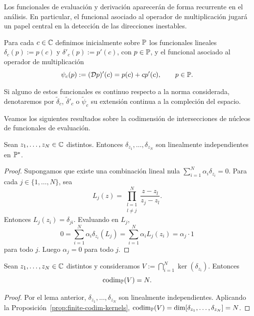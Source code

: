 Los funcionales de evaluación y derivación aparecerán de forma recurrente en el análisis. En particular, el funcional asociado al operador de multiplicación jugará un papel central en la detección de las direcciones inestables.

\begin{defn}\label{def:funcionales_evaluacion_ch3}
	Para cada $c\in\mathbb{C}$ definimos inicialmente sobre $\mathbb{P}$ los funcionales lineales $\delta_c(p):=p(c)$ y $\delta'_c(p):=p'(c)$, con $p\in\mathbb{P}$, y el funcional asociado al operador de multiplicación
	\begin{equation}\label{eq:def_psi_c}
		\psi_c(p):=(\mathcal{D} p)'(c)=p(c)+cp'(c),
		\qquad p\in\mathbb{P}.
	\end{equation}
\end{defn}

\begin{rmk}
	Si alguno de estos funcionales es continuo respecto a la norma considerada, denotaremos por $\widetilde\delta_c$, $\widetilde\delta'_c$ o $\widetilde\psi_c$ su extensión continua a la compleción del espacio.
\end{rmk}

Veamos los siguientes resultados sobre la codimensión de intersecciones de núcleos de funcionales de evaluación.

\begin{lem}
	Sean $z_1,\dots,z_N\in\mathbb{C}$ distintos. Entonces $\delta_{z_1},\dots,\delta_{z_N}$ son linealmente independientes en $\mathbb{P}^*$.
\end{lem}

\begin{proof}
	Supongamos que existe una combinación lineal nula $\sum_{i=1}^N \alpha_i \delta_{z_i} = 0$.
	Para cada $j\in\{1,\dots,N\}$, sea
	\[
		L_j(z) = \prod_{\substack{l=1 \\ l \neq j}}^{N} \frac{z - z_l}{z_j - z_l}.
	\]
	Entonces $L_j(z_i)=\delta_{ji}$. Evaluando en $L_j$,
	\[
		0 = \sum_{i=1}^N \alpha_i \delta_{z_i}(L_j) = \sum_{i=1}^N \alpha_i L_j(z_i) = \alpha_j \cdot 1
	\]
	para todo $j$. Luego $\alpha_j=0$ para todo $j$.
\end{proof}

\begin{cor}
	Sean $z_1,\dots,z_N\in\mathbb{C}$ distintos y consideramos
	\(
	V:=\bigcap_{i=1}^N \ker(\delta_{z_i}).
	\)
	Entonces
	\[
		\operatorname{codim}_{\mathbb{P}}(V)=N.
	\]
\end{cor}

\begin{proof}
	Por el lema anterior, $\delta_{z_1},\dots,\delta_{z_N}$ son linealmente independientes. Aplicando la Proposición~\ref{prop:finite-codim-kernels},
	\(\operatorname{codim}_{\mathbb{P}}(V) = \dim[\delta_{z_1}, \dots, \delta_{z_N}] = N\).
\end{proof}

